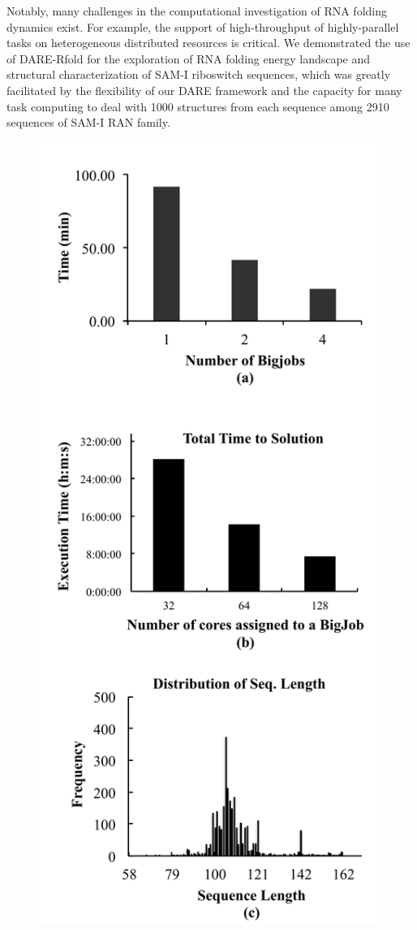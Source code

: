 \documentclass{sig-alternate}
\begin{document}
Notably, many challenges in the computational investigation of RNA folding dynamics exist.  For example, the support of high-throughput of highly-parallel tasks on heterogeneous distributed resources is critical.
We demonstrated the use of DARE-Rfold for the exploration of RNA folding energy landscape and structural characterization of SAM-I riboswitch sequences, which was greatly facilitated by the flexibility of our DARE framework and the capacity for many task computing to deal with 1000 structures from each sequence among 2910 sequences of SAM-I RAN family\cite{ecmls10}. 

\begin{figure}
 \centering
\includegraphics[scale=0.50]{figures/dare-rfold-result.pdf}


\end{figure}
\end{document}
